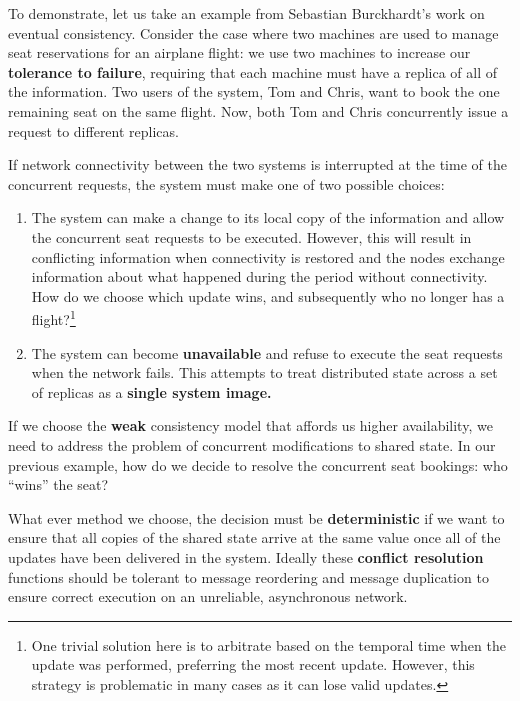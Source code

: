 \documentclass[english]{article}
\begin{document}
To demonstrate, let us take an example from Sebastian Burckhardt's work \cite{export:230852} on eventual consistency.  Consider the case where two machines are used to manage seat reservations for an airplane flight: we use two machines to increase our \textbf{tolerance to failure}, requiring that each machine must have a replica of all of the information.  Two users of the system, Tom and Chris, want to book the one remaining seat on the same flight.  Now, both Tom and Chris concurrently issue a request to different replicas.

If network connectivity between the two systems is interrupted at the time of the concurrent requests, the system must make one of two possible choices:
\begin{enumerate}
  \item The system can make a change to its local copy of the information and allow the concurrent seat requests to be executed.  However, this will result in conflicting information when connectivity is restored and the nodes exchange information about what happened during the period without connectivity.  How do we choose which update wins, and subsequently who no longer has a flight?\footnote{One trivial solution here is to arbitrate based on the temporal time when the update was performed, preferring the most recent update.  However, this strategy is problematic in many cases as it can lose valid updates.}
  \item The system can become \textbf{unavailable} and refuse to execute the seat requests when the network fails.  This attempts to treat distributed state across a set of replicas as a \textbf{single system image.}
\end{enumerate}

If we choose the \textbf{weak} consistency model that affords us higher availability, we need to address the problem of concurrent modifications to shared state.  In our previous example, how do we decide to resolve the concurrent seat bookings: who ``wins'' the seat?

What ever method we choose, the decision must be \textbf{deterministic} if we want to ensure that all copies of the shared state arrive at the same value once all of the updates have been delivered in the system.  Ideally these \textbf{conflict resolution} functions \cite{terry1995managing} should be tolerant to message reordering and message duplication \cite{shapiro2011comprehensive} to ensure correct execution on an unreliable, asynchronous network.
\end{document}
